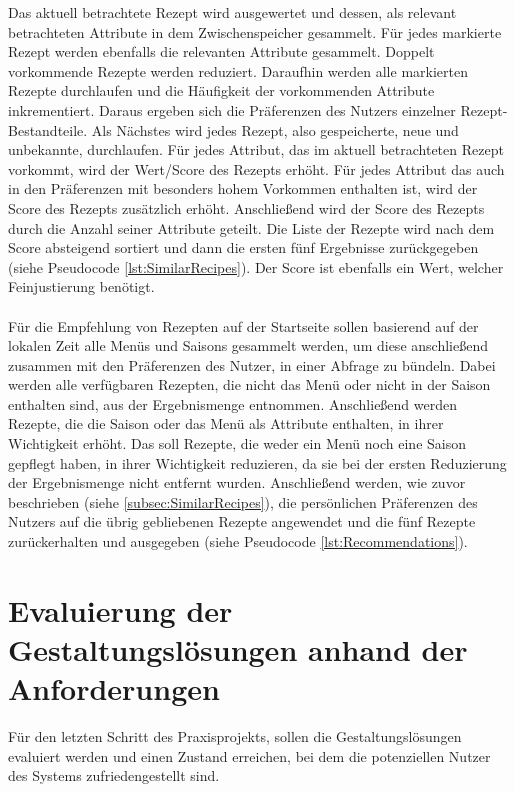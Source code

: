 Das aktuell betrachtete Rezept wird ausgewertet und dessen, als relevant betrachteten Attribute in dem Zwischenspeicher gesammelt. Für jedes markierte Rezept werden ebenfalls die relevanten Attribute gesammelt. Doppelt vorkommende Rezepte werden reduziert. Daraufhin werden alle markierten Rezepte durchlaufen und die Häufigkeit der vorkommenden Attribute inkrementiert. Daraus ergeben sich die Präferenzen des Nutzers einzelner Rezept-Bestandteile. Als Nächstes wird jedes Rezept, also gespeicherte, neue und unbekannte, durchlaufen. Für jedes Attribut, das im aktuell betrachteten Rezept  vorkommt, wird der Wert/Score des Rezepts erhöht. Für jedes Attribut das auch in den Präferenzen mit besonders hohem Vorkommen enthalten ist, wird der Score des Rezepts zusätzlich erhöht. Anschließend wird der Score des Rezepts durch die Anzahl seiner Attribute geteilt. Die Liste der Rezepte wird nach dem Score absteigend sortiert und dann die ersten fünf Ergebnisse zurückgegeben (siehe Pseudocode \ref{lst:SimilarRecipes}). Der Score ist ebenfalls ein Wert, welcher Feinjustierung benötigt.
\\ 
\label{subsec:Recommendations}
\\
Für die Empfehlung von Rezepten auf der Startseite sollen basierend auf der lokalen Zeit alle Menüs und Saisons gesammelt werden, um diese anschließend zusammen mit den Präferenzen des Nutzer, in einer Abfrage zu bündeln. Dabei werden alle verfügbaren Rezepten, die nicht das Menü oder nicht in der Saison enthalten sind, aus der Ergebnismenge entnommen. Anschließend werden Rezepte, die die Saison oder das Menü als Attribute enthalten, in ihrer Wichtigkeit erhöht. Das soll Rezepte, die weder ein Menü noch eine Saison gepflegt haben, in ihrer Wichtigkeit reduzieren, da sie bei der ersten Reduzierung der Ergebnismenge nicht entfernt wurden. Anschließend werden, wie zuvor beschrieben (siehe \ref{subsec:SimilarRecipes}), die persönlichen Präferenzen des Nutzers auf die übrig gebliebenen Rezepte angewendet und die fünf Rezepte zurückerhalten und ausgegeben (siehe Pseudocode \ref{lst:Recommendations}). \\

\chapter{Evaluierung der Gestaltungslösungen anhand der Anforderungen}
Für den letzten Schritt des Praxisprojekts, sollen die Gestaltungslösungen evaluiert werden und einen Zustand erreichen, bei dem die potenziellen Nutzer des Systems zufriedengestellt sind. \\

